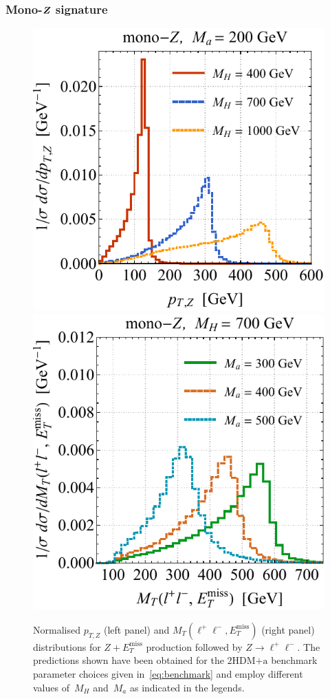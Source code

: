 \documentclass[review]{elsarticle}
\newcommand{\MET}{\ensuremath{E_T^\mathrm{miss}}\xspace}
\newcommand{\hdma}{\ensuremath{\textrm{2HDM+a}}\xspace}
\def\bm#1{\mbox{\boldmath$#1$\unboldmath}}
\begin{document}
\subsubsection[Mono-$Z$ signature]{Mono-$\bm{Z}$ signature}

\begin{figure}[t!]
\centering
\includegraphics[height=0.45\textwidth]{ptzspec.pdf}	\qquad 
\includegraphics[height=0.45\textwidth]{mtspec.pdf}
\vspace{2mm}
\caption{\label{fig:zptmt} Normalised $p_{T,Z}$ (left panel) and $M_T (\ell^+ \ell^-, \MET)$ (right panel) distributions for $Z + \MET$ production followed by $Z \to \ell^+ \ell^-$. The  predictions shown have been obtained for the \hdma benchmark parameter choices  given in~\eqref{eq:benchmark} and employ different values of~$M_H$ and~$M_a$ as indicated in the legends.}
\end{figure}
\end{document}
